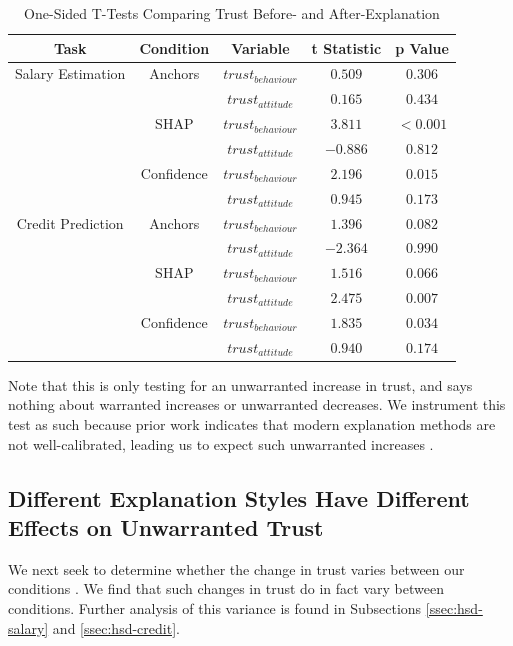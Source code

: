 \begin{table}[htbp]
    \caption{One-Sided T-Tests Comparing Trust Before- and After-Explanation}
    \begin{center}
    \begin{tabular}{ccccc}
        \toprule
        Task & Condition & Variable & t Statistic & p Value \\ 
        \midrule
        Salary Estimation & Anchors & $trust_{behaviour}$ & $0.509$ & $0.306$ \\
        & & $trust_{attitude}$ & $0.165$ & $0.434$ \\
        & SHAP & $trust_{behaviour}$ & $\mathbf{3.811}$ & $\mathbf{<0.001}$ \\
        & & $trust_{attitude}$ & $-0.886$ & $0.812$ \\
        & Confidence & $trust_{behaviour}$ & $\mathbf{2.196}$ & $\mathbf{0.015}$ \\
        & & $trust_{attitude}$ & $0.945$ & $0.173$ \\
        \midrule
        Credit Prediction & Anchors & $trust_{behaviour}$ & $1.396$ & $0.082$ \\
        & & $trust_{attitude}$ & $-2.364$ & $0.990$ \\
        & SHAP & $trust_{behaviour}$ & $1.516$ & $0.066$ \\
        & & $trust_{attitude}$ & $\mathbf{2.475}$ & $\mathbf{0.007}$ \\
        & Confidence & $trust_{behaviour}$ & $\mathbf{1.835}$ & $\mathbf{0.034}$ \\
        & & $trust_{attitude}$ & $0.940$ & $0.174$ \\
        \bottomrule
    \end{tabular}
    \label{tab:delta-trust-t}
    \end{center}
\end{table}

Note that this is only testing for an unwarranted increase in trust, and says nothing about warranted increases or unwarranted decreases. We instrument this test as such because prior work indicates that modern explanation methods are not well-calibrated, leading us to expect such unwarranted increases \cite{miller_explainable_2023}.

\subsection{Different Explanation Styles Have Different Effects on Unwarranted Trust}\label{ssec:anovas}
We next seek to determine whether the change in trust varies between our conditions \cite{natarajan_binns_2022}. We find that such changes in trust do in fact vary between conditions. Further analysis of this variance is found in Subsections \ref{ssec:hsd-salary} and \ref{ssec:hsd-credit}.

